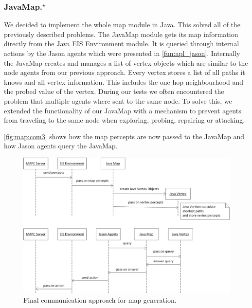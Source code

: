 \subsubsection[JavaMap]{JavaMap.$^\star$}\label{alg:map_javamap}
We decided to implement the whole map module in Java.
This solved all of the previously described problems.
The JavaMap module gets its map information directly from the Java EIS Environment module.
It is queried through internal actions by the Jason agents which were presented in \autoref{fun:apl_jason}.
Internally the JavaMap creates and manages a list of vertex-objects which are similar to the node agents from our previous approach.
Every vertex stores a list of all paths it knows and all vertex information.
This includes the one-hop neighbourhood and the probed value of the vertex.
During our tests we often encountered the problem that multiple agents where sent to the same node.
To solve this, we extended the functionality of our JavaMap with a mechanism to prevent agents from traveling to the same node when exploring, probing, repairing or attacking.

\autoref{fig:map:com3} shows how the map percepts are now passed to the JavaMap and how Jason agents query the JavaMap.
\begin{figure}
  \centering
  \includegraphics[width=\linewidth]{images/map_com_3.png}
  \caption{Final communication approach for map generation.}
  \label{fig:map:com3}
\end{figure}

